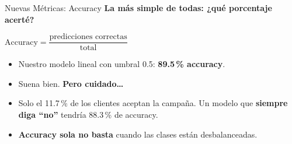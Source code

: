 \documentclass[aspectratio=169, 11pt]{beamer}
\begin{document}
\begin{frame}[shrink=5]{Nuevas Métricas: Accuracy}
  \vspace{-4pt}
  {\footnotesize\color{arcaDark}\bfseries
    La más simple de todas: ¿qué porcentaje acerté?}

  \vspace{6pt}
  \begin{center}
    \begin{tcolorbox}[colback=arcaGray, colframe=arcaRed, boxrule=1pt,
                      arc=4pt, width=0.55\textwidth]
    \centering
    \large
    $\text{Accuracy} = \dfrac{\text{predicciones correctas}}{\text{total}}$
    \end{tcolorbox}
  \end{center}

  \vspace{6pt}
  {\footnotesize
  \begin{itemize}\setlength{\itemsep}{5pt}
    \item[{\color{arcaRed}\faArrowRight}]
      Nuestro modelo lineal con umbral 0.5: \textbf{89.5\,\% accuracy}.
    \item[{\color{arcaRed}\faArrowRight}]
      Suena bien. \textbf{Pero cuidado\ldots}
    \item[{\color{codeOrange}\faExclamationTriangle}]
      Solo el 11.7\,\% de los clientes aceptan la campaña. Un modelo que
      \textbf{siempre diga ``no''} tendría 88.3\,\% de accuracy.
    \item[{\color{arcaRed}\faArrowRight}]
      \textbf{Accuracy sola no basta} cuando las clases están desbalanceadas.
  \end{itemize}
  }
\end{frame}
\end{document}

